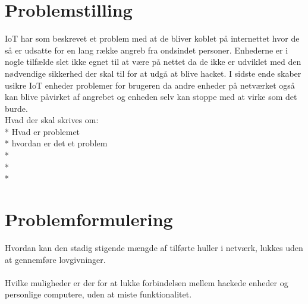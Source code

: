 \section{Problemstilling}

IoT har som beskrevet et problem med at de bliver koblet på internettet hvor de så er udsatte for en lang række angreb fra ondsindet personer. Enhederne er i nogle tilfælde slet ikke egnet til at være på nettet da de ikke er udviklet med den nødvendige sikkerhed der skal til for at udgå at blive hacket. I sidste ende skaber usikre IoT enheder problemer for brugeren da andre enheder på netværket også kan blive påvirket af angrebet og enheden selv kan stoppe med at virke som det burde.\\

Hvad der skal skrives om:\\
* Hvad er problemet \\
* hvordan er det et problem\\
* \\
* \\
* \\


\section{Problemformulering}
Hvordan kan den stadig stigende mængde af tilførte huller i netværk, lukkes uden at gennemføre lovgivninger.\\
\\
Hvilke muligheder er der for at lukke forbindelsen mellem hackede enheder og personlige computere, uden at miste funktionalitet.